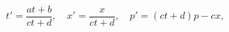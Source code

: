 \begin{equation}\label{CT}
  t'=\frac{at+b}{ct+d},\quad x'=\frac{x}{ct+d},\quad p'=(ct+d)p-cx,
\end{equation}

